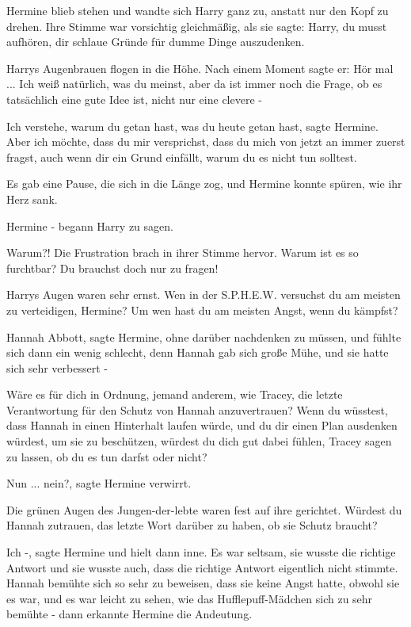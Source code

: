 Hermine blieb stehen und wandte sich Harry ganz zu, anstatt nur den Kopf zu
drehen. Ihre Stimme war vorsichtig gleichmäßig, als sie sagte: \glqq{}Harry, du
musst aufhören, dir schlaue Gründe für dumme Dinge auszudenken.\grqq{}

Harrys Augenbrauen flogen in die Höhe. Nach einem Moment sagte er: \glqq{}Hör
mal ... Ich weiß natürlich, was du meinst, aber da ist immer noch die Frage, ob
es tatsächlich eine gute Idee ist, nicht nur eine clevere -\grqq{}

\glqq{}Ich verstehe, warum du getan hast, was du heute getan hast\grqq{}, sagte
Hermine. \glqq{}Aber ich möchte, dass du mir versprichst, dass du mich von jetzt
an immer zuerst fragst, auch wenn dir ein Grund einfällt, warum du es nicht tun
solltest.\grqq{}

Es gab eine Pause, die sich in die Länge zog, und Hermine konnte spüren, wie ihr
Herz sank.

\glqq{}Hermine -\grqq{} begann Harry zu sagen.

\glqq{}Warum?!\grqq{} Die Frustration brach in ihrer Stimme hervor. \glqq{}Warum
ist es so furchtbar? Du brauchst doch nur zu fragen!\grqq{}

Harrys Augen waren sehr ernst. \glqq{}Wen in der S.P.H.E.W. versuchst du am
meisten zu verteidigen, Hermine? Um wen hast du am meisten Angst, wenn du
kämpfst?\grqq{}

\glqq{}Hannah Abbott\grqq{}, sagte Hermine, ohne darüber nachdenken zu müssen,
und fühlte sich dann ein wenig schlecht, denn Hannah gab sich große Mühe, und
sie hatte sich sehr verbessert -

\glqq{}Wäre es für dich in Ordnung, jemand anderem, wie Tracey, die letzte
Verantwortung für den Schutz von Hannah anzuvertrauen? Wenn du wüsstest, dass
Hannah in einen Hinterhalt laufen würde, und du dir einen Plan ausdenken
würdest, um sie zu beschützen, würdest du dich gut dabei fühlen, Tracey sagen zu
lassen, ob du es tun darfst oder nicht?\grqq{}

\glqq{}Nun ... nein?\grqq{}, sagte Hermine verwirrt.

Die grünen Augen des Jungen-der-lebte waren fest auf ihre gerichtet. \glqq{}
Würdest du Hannah zutrauen, das letzte Wort darüber zu haben, ob sie Schutz
braucht?\grqq{}

\glqq{}Ich -\grqq{}, sagte Hermine und hielt dann inne. Es war seltsam, sie
wusste die richtige Antwort und sie wusste auch, dass die richtige Antwort
eigentlich nicht stimmte. Hannah bemühte sich so sehr zu beweisen, dass sie
keine Angst hatte, obwohl sie es war, und es war leicht zu sehen, wie das
Hufflepuff-Mädchen sich zu sehr bemühte - dann erkannte Hermine die Andeutung.

